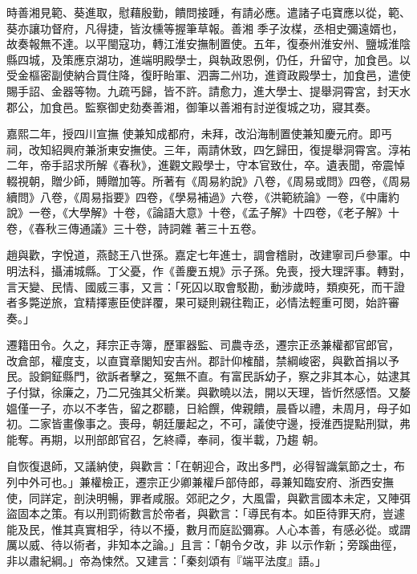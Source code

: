 \begin{pinyinscope}
 時善湘見範、葵進取，慰藉殷勤，饋問接踵，有請必應。遣諸子屯寶應以從，範、葵亦讓功督府，凡得捷，皆汝櫄等握筆草報。善湘
 季子汝楳，丞相史彌遠婿也，故奏報無不達。以平閩寇功，轉江淮安撫制置使。五年，復泰州淮安州、鹽城淮陰縣四城，及策應京湖功，進端明殿學士，與執政恩例，仍任，升留守，加食邑。以受金樞密副使納合買住降，復盱眙軍、泗壽二州功，進資政殿學士，加食邑，遣使賜手詔、金器等物。九疏丐歸，皆不許。請愈力，進大學士、提舉洞霄宮，封天水郡公，加食邑。監察御史劾奏善湘，御筆以善湘有討逆復城之功，寢其奏。



 嘉熙二年，授四川宣撫
 使兼知成都府，未拜，改沿海制置使兼知慶元府。即丐祠，改知紹興府兼浙東安撫使。三年，兩請休致，四乞歸田，復提舉洞霄宮。淳祐二年，帝手詔求所解《春秋》，進觀文殿學士，守本官致仕，卒。遺表聞，帝震悼輟視朝，贈少師，賻贈加等。所著有《周易約說》八卷，《周易或問》四卷，《周易續問》八卷，《周易指要》四卷，《學易補過》六卷，《洪範統論》一卷，《中庸約說》一卷，《大學解》十卷，《論語大意》十卷，《孟子解》十四卷，《老子解》十卷，《春秋三傳通議》三十卷，詩詞雜
 著三十五卷。



 趙與歡，字悅道，燕懿王八世孫。嘉定七年進士，調會稽尉，改建寧司戶參軍。中明法科，攝浦城縣。丁父憂，作《善慶五規》示子孫。免喪，授大理評事。轉對，言天變、民情、國威三事，又言：「死囚以取會駁勘，動涉歲時，類瘐死，而干證者多斃逆旅，宜精擇憲臣使詳覆，果可疑則親往鞫正，必情法輕重可閔，始許審奏。」



 遷籍田令。久之，拜宗正寺簿，歷軍器監、司農寺丞，遷宗正丞兼權都官郎官，
 改倉部，權度支，以直寶章閣知安吉州。郡計仰榷醋，禁綱峻密，與歡首捐以予民。設銅鉦縣門，欲訴者擊之，冤無不直。有富民訴幼子，察之非其本心，姑逮其子付獄，徐廉之，乃二兄強其父析業。與歡曉以法，開以天理，皆忻然感悟。又嫠媼僅一子，亦以不孝告，留之郡聽，日給饌，俾親饋，晨昏以禮，未周月，母子如初。二家皆畫像事之。喪母，朝廷屢起之，不可，議使守邊，授淮西提點刑獄，弗能奪。再期，以刑部郎官召，乞終禫，奉祠，復半載，乃趨
 朝。



 自恢復退師，又議納使，與歡言：「在朝迎合，政出多門，必得智識氣節之士，布列中外可也。」兼權檢正，遷宗正少卿兼權戶部侍郎，尋兼知臨安府、浙西安撫使，同詳定，剖決明暢，罪者咸服。郊祀之夕，大風雷，與歡言國本未定，又陣弭盜固本之策。有以刑罰術數言於帝者，與歡言：「導民有本。如臣待罪天府，豈遽能及民，惟其真實相孚，待以不擾，數月而庭訟彌寡。人心本善，有感必從。或謂厲以威、待以術者，非知本之論。」且言：「朝令夕改，非
 以示作新；旁蹊曲徑，非以肅紀綱。」帝為悚然。又建言：「秦刻頌有『端平法度』語。」




\end{pinyinscope}
